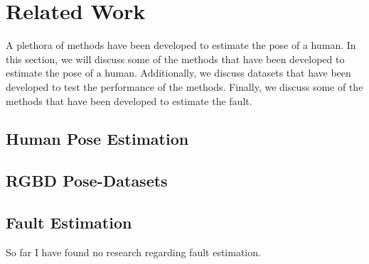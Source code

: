\section{Related Work}
\label{sec:related_work}

A plethora of methods have been developed to estimate the pose of a human. In this section, we will discuss some of the methods that have been developed to estimate the pose of a human. Additionally, we discuss datasets that have been developed to test the performance of the methods. Finally, we discuss some of the methods that have been developed to estimate the fault.

\subsection{Human Pose Estimation}

\subsection{RGBD Pose-Datasets}

\subsection{Fault Estimation}

So far I have found no research regarding fault estimation.
